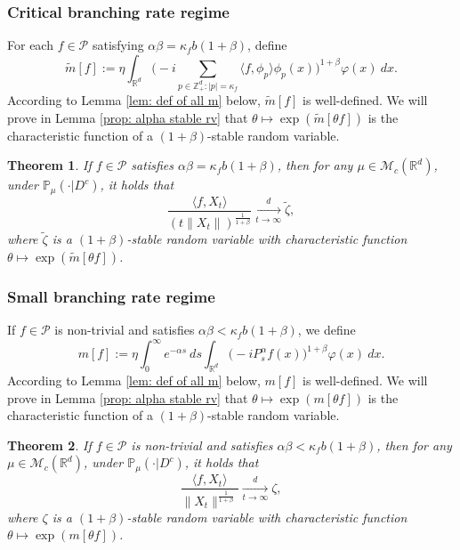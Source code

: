 \documentclass[12pt,a4paper]{amsart}
\theoremstyle{plain}
\newtheorem{thm}{Theorem}[section]
\theoremstyle{definition}
\numberwithin{equation}{section}
\begin{document}
\subsubsection{Critical branching rate regime}
For each $f\in \mathcal{P}$ satisfying $\alpha\beta=\kappa_f b(1+\beta)$, define
\begin{equation}
  \label{tilde-m}
  \widetilde{m}[f]
  := \eta\int_{\mathbb R^d} \Big(-i\sum_{p\in \mathbb Z_+^d:|p|=\kappa_f}\langle f,\phi_p\rangle\phi_p(x)\Big)^{1+\beta} \varphi(x)~dx.
\end{equation}
According to Lemma \ref{lem: def of all m} below, $\widetilde m[f]$ is well-defined.
We will prove in Lemma \ref{prop: alpha stable rv} that $\theta \mapsto \exp( \widetilde m[\theta f])$ is the characteristic function of a $(1+\beta)$-stable random variable.
\begin{thm}
  \label{thm: critical clt}
  If $f\in\mathcal{P}$ satisfies  $\alpha\beta=\kappa_fb(1+\beta)$, then for any $\mu\in \mathcal M_c(\mathbb R^d)$, under $\mathbb{P}_{\mu}(\cdot|D^c)$, it holds that
  \[
    \frac{\langle f,X_t\rangle}{\left(t\|X_t\|\right)^{\frac{1}{1+\beta}}}
    \xrightarrow[t\to \infty]{d} \widetilde{\zeta},
  \]
  where $\widetilde{\zeta}$ is a $(1+\beta)$-stable random variable with characteristic function $\theta\mapsto \exp(\widetilde{m}[\theta f])$.
\end{thm}

\subsubsection{Small branching rate regime}
\label{msmallcase}
If $f\in \mathcal{P}$ is non-trivial and satisfies  $\alpha\beta<\kappa_f b(1+\beta)$, we define
\begin{equation}
  m[f]
  := \eta \int_0^{\infty} e^{-\alpha s} ~ds\int_{\mathbb R^d} \big(-iP_s^\alpha f(x)\big)^{1+\beta} \varphi(x)~dx.
\end{equation}
According to Lemma \ref{lem: def of all m} below, $m[f]$ is well-defined.
We will prove  in Lemma \ref{prop: alpha stable rv} that $\theta \mapsto \exp( m[\theta f])$ is the characteristic function of a $(1+\beta)$-stable random variable.
\begin{thm}
  \label{thm: small clt}
  If $f\in\mathcal{P}$ is non-trivial and satisfies $\alpha\beta<\kappa_f b(1+\beta)$, then for any $\mu\in \mathcal M_c(\mathbb R^d)$, under $\mathbb{P}_{\mu}(\cdot|D^c)$, it holds that
  \[
    \frac{\langle f,X_t\rangle}{\|X_t\|^{\frac{1}{1+\beta}}}\xrightarrow[t\rightarrow \infty]{d} \zeta,
  \]
  where $\zeta$ is a $(1+\beta)$-stable random variable with characteristic function $\theta\mapsto \exp(m[\theta f])$.
\end{thm}
\end{document}

